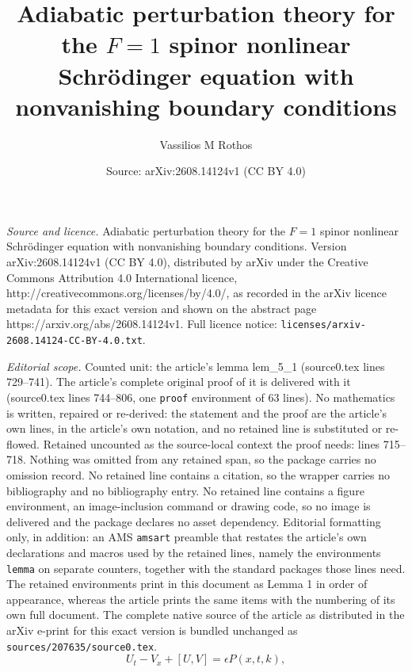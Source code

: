 \documentclass[10pt,a4paper]{amsart}
\title{Adiabatic perturbation theory for the $F=1$ spinor nonlinear Schr\"odinger equation with nonvanishing boundary conditions}
\author{Vassilios M Rothos}
\date{Source: arXiv:2608.14124v1 (CC BY 4.0)}
\begin{document}
\maketitle

\noindent\emph{Source and licence.} Adiabatic perturbation theory for the $F=1$ spinor nonlinear Schr\"odinger equation with nonvanishing boundary conditions. Version arXiv:2608.14124v1 (CC BY 4.0), distributed by arXiv under the Creative Commons Attribution 4.0 International licence, http://creativecommons.org/licenses/by/4.0/, as recorded in the arXiv licence metadata for this exact version and shown on the abstract page https://arxiv.org/abs/2608.14124v1. Full licence notice: \texttt{licenses/arxiv-2608.14124-CC-BY-4.0.txt}.\par\smallskip

\noindent\textit{Editorial scope.} Counted unit: the article's lemma lem\_5\_1 (source0.tex lines 729--741). The article's complete original proof of it is delivered with it (source0.tex lines 744--806, one \texttt{proof} environment of 63 lines). No mathematics is written, repaired or re-derived: the statement and the proof are the article's own lines, in the article's own notation, and no retained line is substituted or re-flowed.  Retained uncounted as the source-local context the proof needs: lines 715--718.  Nothing was omitted from any retained span, so the package carries no omission record.  No retained line contains a citation, so the wrapper carries no bibliography and no bibliography entry.  No retained line contains a figure environment, an image-inclusion command or drawing code, so no image is delivered and the package declares no asset dependency.  Editorial formatting only, in addition: an AMS \texttt{amsart} preamble that restates the article's own declarations and macros used by the retained lines, namely the environments \texttt{lemma} on separate counters, together with the standard packages those lines need.  The retained environments print in this document as Lemma 1 in order of appearance, whereas the article prints the same items with the numbering of its own full document.  The complete native source of the article as distributed in the arXiv e-print for this exact version is bundled unchanged as \texttt{sources/207635/source0.tex}.
\begin{equation}
U_t - V_x + [U,V] = \epsilon P(x,t,k),
\label{eq:ZeroCurvaturePerturbed4}
\end{equation}
\end{document}
